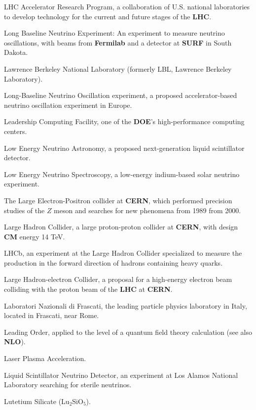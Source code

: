  LHC Accelerator Research Program, a collaboration
of U.S. national laboratories to develop technology for the current
and future stages of the {\bf LHC}. 

 Long Baseline Neutrino Experiment:  An experiment to measure
neutrino oscillations, with beams from {\bf Fermilab} and a detector at {\bf SURF}
in South Dakota.

 Lawrence Berkeley National Laboratory (formerly LBL,
Lawrence Berkeley Laboratory).

 Long-Baseline Neutrino Oscillation experiment, a 
proposed accelerator-based neutrino oscillation experiment in Europe.

  Leadership Computing Facility, one of the {\bf DOE}'s 
          high-performance computing centers.

 Low Energy Neutrino Astronomy, a proposed
next-generation liquid scintillator detector.
 
 Low Energy Neutrino Spectroscopy, a low-energy indium-based
solar neutrino experiment.

 The Large Electron-Positron collider at {\bf CERN}, which 
performed precision studies of the $Z$ meson and searches for new
phenomena from 1989 from 2000.

 Large Hadron Collider, a large proton-proton collider
at {\bf CERN}, with design {\bf CM} energy 14 TeV.

 LHCb, an experiment at the Large Hadron Collider
specialized to measure the production in the forward direction of
hadrons containing heavy quarks.

 Large Hadron-electron Collider, a proposal for a high-energy
electron beam colliding with the proton beam of the {\bf LHC} at {\bf CERN}. 

   Laboratori Nazionali di Frascati,  the leading
particle physics laboratory in Italy, located in Frascati, near Rome.


 Leading Order, applied to the level of a quantum field
theory calculation (see also {\bf NLO}).

  Laser Plasma Acceleration.

 Liquid Scintillator Neutrino Detector, an experiment
at Los Alamos National Laboratory searching for sterile neutrinos.

 Lutetium Silicate (Lu$_2$SiO$_5$).

